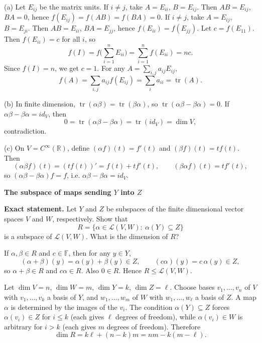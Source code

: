 \begin{solution}
(a) Let \(E_{ij}\) be the matrix units. If \(i\neq j\), take \(A=E_{ii}\), \(B=E_{ij}\). Then \(AB=E_{ij}\), \(BA=0\), hence
\(f(E_{ij})=f(AB)=f(BA)=0\).
If \(i\neq j\), take \(A=E_{ij}\), \(B=E_{ji}\). Then \(AB=E_{ii}\), \(BA=E_{jj}\), hence \(f(E_{ii})=f(E_{jj})\).
Let \(c=f(E_{11})\). Then \(f(E_{ii})=c\) for all \(i\), so
\[
f(I)=f\Big(\sum_{i=1}^n E_{ii}\Big)=\sum_{i=1}^n f(E_{ii})=nc.
\]
Since \(f(I)=n\), we get \(c=1\).
For any \(A=\sum_{i,j} a_{ij}E_{ij}\),
\[
f(A)=\sum_{i,j} a_{ij}f(E_{ij})=\sum_i a_{ii}=\operatorname{tr}(A).
\]

(b) In finite dimension, \(\operatorname{tr}(\alpha\beta)=\operatorname{tr}(\beta\alpha)\), so
\(\operatorname{tr}(\alpha\beta-\beta\alpha)=0\).
If \(\alpha\beta-\beta\alpha=id_V\), then
\[
0=\operatorname{tr}(\alpha\beta-\beta\alpha)=\operatorname{tr}(id_V)=\dim V,
\]
contradiction.

(c) On \(V=C^\infty(\mathbb R)\), define \((\alpha f)(t)=f'(t)\) and \((\beta f)(t)=t f(t)\). Then
\[
(\alpha\beta f)(t)=(t f(t))'=f(t)+t f'(t),\qquad (\beta\alpha f)(t)=t f'(t),
\]
so \((\alpha\beta-\beta\alpha)f=f\), i.e. \(\alpha\beta-\beta\alpha=id_V\).
\end{solution}

\begin{problem}[CP-I-0100]
\label{prob:cp-i-0100}
\textbf{The subspace of maps sending $Y$ into $Z$}

\textbf{Exact statement.}
\hspace*{1.5em}Let $Y$ and $Z$ be subspaces of the finite dimensional vector spaces $V$ and $W$, respectively.
Show that
\[
R=\{\alpha\in \mathcal L(V,W):\ \alpha(Y)\subseteq Z\}
\]
is a subspace of $\mathcal L(V,W)$. What is the dimension of $R$?
\end{problem}

\begin{solution}
If $\alpha,\beta\in R$ and $c\in\mathbb F$, then for any $y\in Y$,
\[
(\alpha+\beta)(y)=\alpha(y)+\beta(y)\in Z,\qquad (c\alpha)(y)=c\,\alpha(y)\in Z,
\]
so $\alpha+\beta\in R$ and $c\alpha\in R$. Also $0\in R$. Hence $R\le \mathcal L(V,W)$.

Let $\dim V=n$, $\dim W=m$, $\dim Y=k$, $\dim Z=\ell$.
Choose bases $v_1,\dots,v_n$ of $V$ with $v_1,\dots,v_k$ a basis of $Y$, and $w_1,\dots,w_m$ of $W$ with
$w_1,\dots,w_\ell$ a basis of $Z$.
A map $\alpha$ is determined by the images of the $v_i$.
The condition $\alpha(Y)\subseteq Z$ forces $\alpha(v_i)\in Z$ for $i\le k$ (each gives $\ell$ degrees of freedom),
while $\alpha(v_i)\in W$ is arbitrary for $i>k$ (each gives $m$ degrees of freedom).
Therefore
\[
\dim R=k\ell+(n-k)m=nm-k(m-\ell).
\]

\bigskip
\end{solution}

